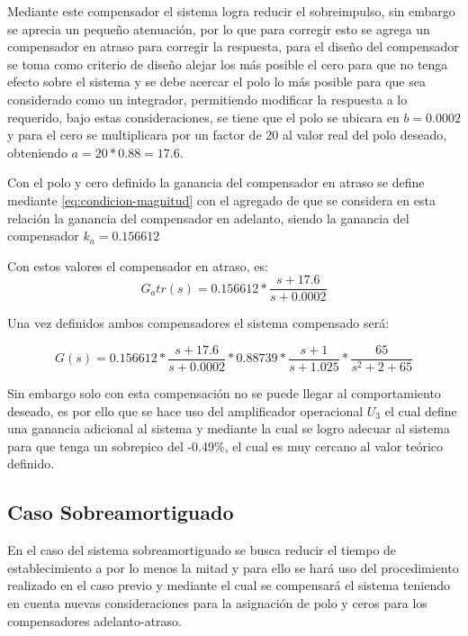 \documentclass[conference]{IEEEtran}
\begin{document}
	Mediante este compensador el sistema logra reducir el sobreimpulso, sin embargo se aprecia un pequeño atenuación, por lo que para corregir esto se agrega un compensador en atraso para corregir la respuesta, para el diseño del compensador se toma como criterio de diseño alejar los más posible el cero para que no tenga efecto sobre el sistema y se debe acercar el polo lo más posible para que sea considerado como un integrador, permitiendo modificar la respuesta a lo requerido, bajo estas consideraciones, se tiene que el polo se ubicara en $b = 0.0002$ y para el cero se multiplicara por un factor de 20 al valor real del polo deseado, obteniendo $a = 20*0.88 = 17.6$.
	
	Con el polo y cero definido la ganancia del compensador en atraso se define mediante \ref{eq:condicion-magnitud} con el agregado de que se considera en esta relación la ganancia del compensador en adelanto, siendo la ganancia del compensador $k_a = 0.156612$
	
	
	Con estos valores el compensador en atraso, es:
	\begin{equation}
		G_atr(s) = 0.156612*\frac{s + 17.6}{s + 0.0002}
		\label{eq:compensador-atraso-sub}
	\end{equation}
	
	Una vez definidos ambos compensadores el sistema compensado será:
	
	\begin{equation}
		G(s) = 0.156612*\frac{s + 17.6}{s + 0.0002}*0.88739*\frac{s + 1}{s + 1.025}*\frac{65}{s^2 + 2 + 65}
		\label{eq:sistema-sub-compensado}	
	\end{equation}
	
	Sin embargo solo con esta compensación no se puede llegar al comportamiento deseado, es por ello que se hace uso del amplificador operacional $U_3$ el cual define una ganancia adicional al sistema y mediante la cual se logro adecuar al sistema para que tenga un sobrepico del -0.49\%, el cual es muy cercano al valor teórico definido.

	\subsection{\textbf{Caso Sobreamortiguado}}
	
	En el caso del sistema sobreamortiguado se busca reducir el tiempo de establecimiento a por lo menos la mitad y para ello se hará uso del procedimiento realizado en el caso previo y mediante el cual se compensará el sistema teniendo en cuenta nuevas consideraciones para la asignación de polo y ceros para los compensadores adelanto-atraso.
	
\end{document}

